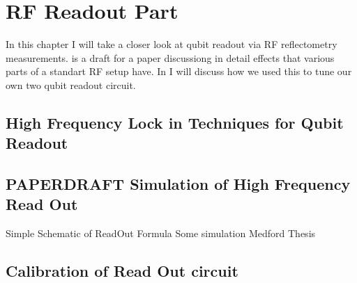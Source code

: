 \chapter{RF Readout Part}
\label{chap:setup}
In this chapter I will take a closer look at qubit readout via RF reflectometry measurements.  is a draft for a paper discussiong in detail effects that various parts of a standart RF setup have. In  I will discuss how we used this to tune our own two qubit readout circuit.

\section{High Frequency Lock in Techniques for Qubit Readout}
\label{sec:RF_paper}

\section{PAPERDRAFT Simulation of High Frequency Read Out}
Simple Schematic of ReadOut 
Formula
Some simulation
Medford Thesis



\section{Calibration of Read Out circuit}
\label{sec:RFcalib}


